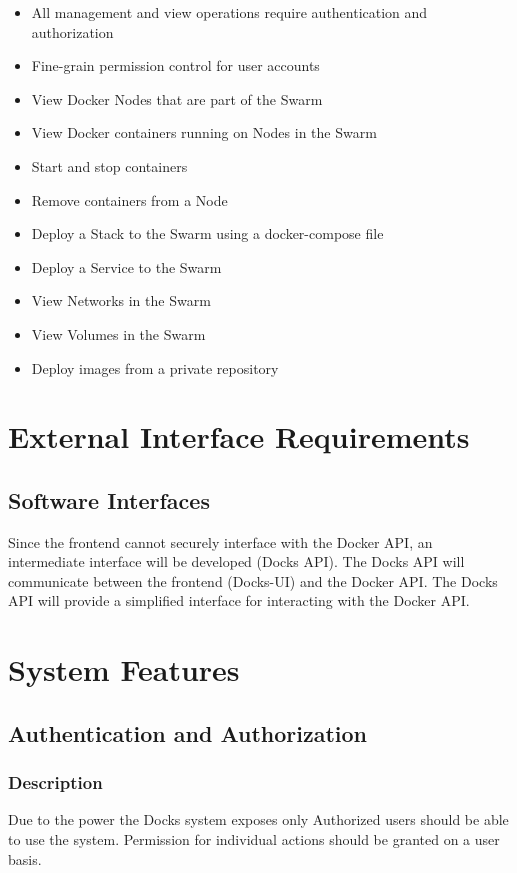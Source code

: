 \documentclass[]{article}
\begin{document}
\begin{itemize}
	\item All management and view operations require authentication and authorization
	\item Fine-grain permission control for user accounts
	\item View Docker Nodes that are part of the Swarm
	\item View Docker containers running on Nodes in the Swarm
	\item Start and stop containers
	\item Remove containers from a Node
	\item Deploy a Stack to the Swarm using a docker-compose file
	\item Deploy a Service to the Swarm
	\item View Networks in the Swarm
	\item View Volumes in the Swarm
	\item Deploy images from a private repository
\end{itemize}

\section{External Interface Requirements}
\subsection{Software Interfaces}
Since the frontend cannot securely interface with the Docker API, an intermediate interface will be developed (Docks API). The Docks API will communicate between the frontend (Docks-UI) and the Docker API. The Docks API will provide a simplified interface for interacting with the Docker API.

\section{System Features}
\subsection{Authentication and Authorization}
\subsubsection{Description}
Due to the power the Docks system exposes only Authorized users should be able to use the system. Permission for individual actions should be granted on a user basis.
\end{document}
